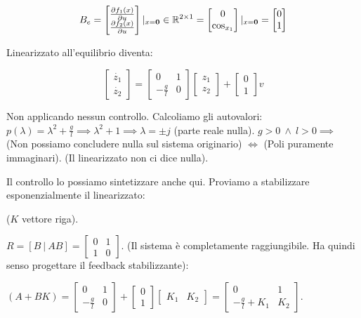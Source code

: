 \[
	B_e = \begin{bmatrix}\frac{\partial{f_1(x)}}{\partial{u}}\\ \frac{\partial{f_2(x)}}{\partial{u}}\end{bmatrix}|_{x=\mathbf{0}} \in \mathbb{R}^{2 \times 1} = \begin{bmatrix}0\\ \cos_{x_1}\end{bmatrix}|_{x=\mathbf{0}} = \begin{bmatrix}0\\1\end{bmatrix}
\]

Linearizzato all'equilibrio diventa:

\[
	\begin{bmatrix}\dot{z_1}\\ \dot{z_2}\end{bmatrix} = \begin{bmatrix}0 & 1\\ -\frac{g}{l} & 0\end{bmatrix}\begin{bmatrix}z_1\\z_2 \end{bmatrix} + \begin{bmatrix}0\\1\end{bmatrix}v
\]

Non applicando nessun controllo. Calcoliamo gli autovalori: $p(\lambda) = \lambda^2 + \frac{g}{l} \implies \lambda^2 + 1 \implies \lambda = \pm j$ (parte reale nulla). $g > 0\ \land\ l > 0 \implies$ (Non possiamo concludere nulla sul sistema originario) $\iff$ (Poli puramente immaginari). (Il linearizzato non ci dice nulla).

Il controllo lo possiamo sintetizzare anche qui. Proviamo a stabilizzare esponenzialmente il linearizzato:

($K$ vettore riga).

$R=[B\ |\ AB] = \begin{bmatrix}0 & 1 \\ 1 & 0\end{bmatrix}$. (Il sistema è completamente raggiungibile. Ha quindi senso progettare il feedback stabilizzante):

$(A+BK) = \begin{bmatrix}0&1\\-\frac{g}{l} & 0\end{bmatrix} + \begin{bmatrix}0\\1\end{bmatrix}\begin{bmatrix}K_1 & K_2\end{bmatrix} = \begin{bmatrix}0&1 \\ -\frac{g}{l}+K_1 & K_2\end{bmatrix}$.

